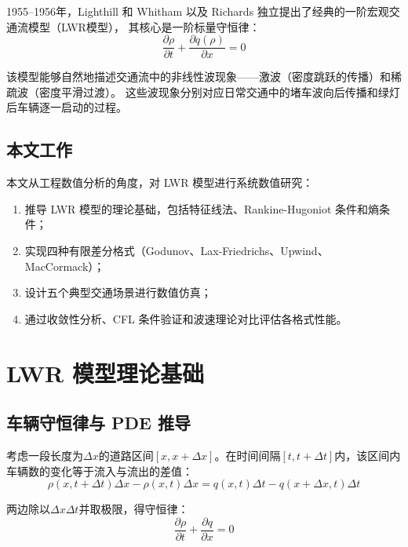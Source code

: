 \documentclass[12pt,a4paper]{ctexart}
\begin{document}
1955--1956年，Lighthill 和 Whitham \cite{lighthill1955} 以及 Richards \cite{richards1956} 独立提出了经典的一阶宏观交通流模型（LWR模型），
其核心是一阶标量守恒律：
\begin{equation}
    \frac{\partial \rho}{\partial t} + \frac{\partial q(\rho)}{\partial x} = 0
    \label{eq:lwr}
\end{equation}

该模型能够自然地描述交通流中的非线性波现象——激波（密度跳跃的传播）和稀疏波（密度平滑过渡）。
这些波现象分别对应日常交通中的堵车波向后传播和绿灯后车辆逐一启动的过程。

\subsection{本文工作}

本文从工程数值分析的角度，对 LWR 模型进行系统数值研究：
\begin{enumerate}[label=(\arabic*)]
    \item 推导 LWR 模型的理论基础，包括特征线法、Rankine-Hugoniot 条件和熵条件；
    \item 实现四种有限差分格式（Godunov、Lax-Friedrichs、Upwind、MacCormack）；
    \item 设计五个典型交通场景进行数值仿真；
    \item 通过收敛性分析、CFL 条件验证和波速理论对比评估各格式性能。
\end{enumerate}

\newpage

\section{LWR 模型理论基础}

\subsection{车辆守恒律与 PDE 推导}

考虑一段长度为$\Delta x$的道路区间$[x, x+\Delta x]$。在时间间隔$[t, t+\Delta t]$内，该区间内车辆数的变化等于流入与流出的差值：
\begin{equation}
    \rho(x, t+\Delta t)\Delta x - \rho(x, t)\Delta x = q(x, t)\Delta t - q(x+\Delta x, t)\Delta t
\end{equation}

两边除以$\Delta x \Delta t$并取极限，得守恒律：
\begin{equation}
    \frac{\partial \rho}{\partial t} + \frac{\partial q}{\partial x} = 0
\end{equation}
\end{document}
